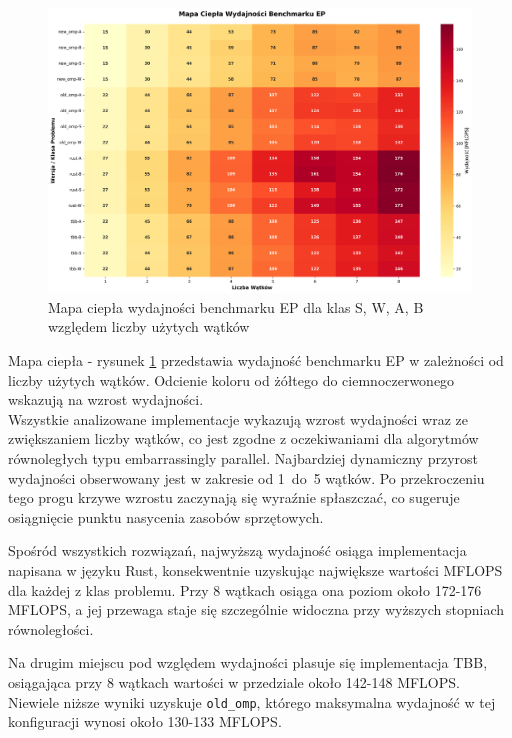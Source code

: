 \begin{figure}[H]
    \centering
    \includegraphics[width=\textwidth]{analiza/images/parallel/ep/x86/ep_mapa_ciepla_wydajnosci.png}
    \caption{Mapa ciepła wydajności benchmarku EP dla klas S, W, A, B względem liczby użytych wątków}
    \label{ep_heatmap_wydajnosci_x86_64}
\end{figure}
Mapa ciepła - rysunek \ref{ep_heatmap_wydajnosci_x86_64} przedstawia wydajność benchmarku EP w zależności od liczby użytych wątków. Odcienie koloru od żółtego do ciemnoczerwonego wskazują na wzrost wydajności.\\


Wszystkie analizowane implementacje wykazują wzrost wydajności wraz ze zwiększaniem liczby wątków, co jest zgodne z oczekiwaniami dla algorytmów równoległych typu embarrassingly parallel. Najbardziej dynamiczny przyrost wydajności obserwowany jest w zakresie od \mbox{1 do 5} wątków. Po przekroczeniu tego progu krzywe wzrostu zaczynają się wyraźnie spłaszczać, co sugeruje osiągnięcie punktu nasycenia zasobów sprzętowych.

Spośród wszystkich rozwiązań, najwyższą wydajność osiąga implementacja napisana w języku Rust, konsekwentnie uzyskując największe wartości MFLOPS dla każdej z klas problemu. Przy 8 wątkach osiąga ona poziom około 172-176 MFLOPS, a jej przewaga staje się szczególnie widoczna przy wyższych stopniach równoległości.

Na drugim miejscu pod względem wydajności plasuje się implementacja TBB, osiągająca przy 8 wątkach wartości w przedziale około 142-148 MFLOPS. Niewiele niższe wyniki uzyskuje \texttt{old\_omp}, którego maksymalna wydajność w tej konfiguracji wynosi około 130-133 MFLOPS.

